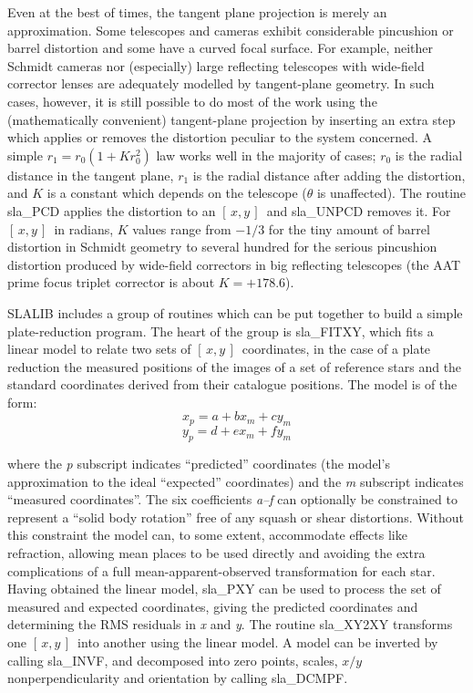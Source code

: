 \documentclass[11pt,twoside]{article}
\newcommand{\xy}        {$[\,x,y\,]$}
\begin{document}
Even at the best of times, the tangent plane projection is merely an
approximation.  Some telescopes and cameras exhibit considerable pincushion
or barrel distortion and some have a curved focal surface.
For example, neither Schmidt cameras nor (especially)
large reflecting telescopes with wide-field corrector lenses
are adequately modelled by tangent-plane geometry.  In such
cases, however, it is still possible to do most of the work
using the (mathematically convenient) tangent-plane
projection by inserting an extra step which applies or
removes the distortion peculiar to the system concerned.
A simple $r_1=r_0(1+Kr_0^2)$ law works well in the
majority of cases; $r_0$ is the radial distance in the
tangent plane, $r_1$ is the radial distance after adding
the distortion, and $K$ is a constant which depends on the
telescope ($\theta$ is unaffected).  The routine
sla\_PCD
applies the distortion to an \xy\ and
sla\_UNPCD
removes it.  For \xy\ in radians, $K$ values range from $-1/3$ for the
tiny amount of barrel distortion in Schmidt geometry to several
hundred for the serious pincushion distortion
produced by wide-field correctors in big reflecting telescopes
(the AAT prime focus triplet corrector is about $K=+178.6$).

SLALIB includes a group of routines which can be put together
to build a simple plate-reduction program.  The heart of the group is
sla\_FITXY,
which fits a linear model to relate two sets of \xy\ coordinates,
in the case of a plate reduction the measured positions of the
images of a set of
reference stars and the standard
coordinates derived from their catalogue positions.  The
model is of the form:
\[x_{p} = a + bx_{m} + cy_{m}\]
\[y_{p} = d + ex_{m} + fy_{m}\]

where the {\it p}\/ subscript indicates ``predicted'' coordinates
(the model's approximation to the ideal ``expected'' coordinates) and the
{\it m}\/ subscript indicates ``measured coordinates''.  The
six coefficients {\it a--f}\/ can optionally be
constrained to represent a ``solid body rotation'' free of
any squash or shear distortions.  Without this constraint
the model can, to some extent, accommodate effects like refraction,
allowing mean places to be used directly and
avoiding the extra complications of a
full mean-apparent-observed transformation for each star.
Having obtained the linear model,
sla\_PXY
can be used to process the set of measured and expected
coordinates, giving the predicted coordinates and determining
the RMS residuals in {\it x}\/ and {\it y}.
The routine
sla\_XY2XY
transforms one \xy\ into another using the linear model.  A model
can be inverted by calling
sla\_INVF,
and decomposed into zero points, scales, $x/y$ nonperpendicularity
and orientation by calling
sla\_DCMPF.
\end{document}
